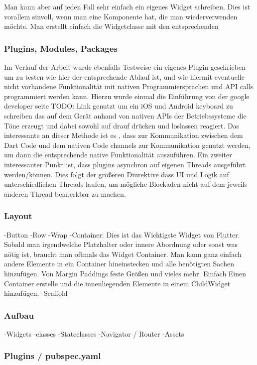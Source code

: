 Man kann aber auf jeden Fall sehr einfach ein eigenes Widget schreiben. Dies ist vorallem sinvoll, wenn man eine Komponente hat, die man wiederverwenden möchte. Man erstellt einfach die Widgetclasse mit den entsprechenden 
\subsubsection{Plugins, Modules, Packages}
Im Verlauf der Arbeit wurde ebenfalls Testweise ein eigenes Plugin geschrieben um zu testen wie hier der entsprechende Ablauf ist, und wie hiermit eventuelle nicht vorhandene Funktionalität mit nativen Programmiersprachen und API calls programmiert werden kann. Hierzu wurde einmal die Einführung von der google developer seite TODO: Link genutzt um ein iOS und Android keyboard zu schreiben das auf dem Gerät anhand von nativen APIs der Betriebssysteme die Töne erzeugt und dabei sowohl auf drauf drücken und loslassen reagiert.
Das interessante an dieser Methode ist es , dass zur Kommunikation zwischen dem Dart Code und dem nativen Code channels zur Kommunikation genutzt werden, um dann die entsprechende native Funktionalität auszuführen. Ein zweiter interessanter Punkt ist, dass plugins asynchron auf eigenen Threads ausgeführt werden/können. Dies folgt der größeren Diurektive dass UI und Logik auf unterschiedlichen Threads laufen, um mögliche Blockaden nicht auf dem jeweils anderen Thread bem,erkbar zu machen.



\subsubsection{Layout}
-Button
-Row
-Wrap
-Container: Dies ist das Wichtigste Widget von Flutter. Sobald man irgendwelche Platzhalter oder innere Abordnung oder sonst was nötig ist, braucht man oftmals das Widget Container. Man kann ganz einfach andere Elemente in ein Container hineinstecken und alle benötigten Sachen hinzufügen. Von Margin Paddings feste Größen und vieles mehr. Einfach Einen Container erstelle und die innenliegenden Elemente in einem ChildWidget hinzufügen.
-Scaffold
\subsubsection{Aufbau}
-Widgets
-classes
-Stateclasses
-Navigator / Router
-Assets

\subsubsection{Plugins / pubspec.yaml}
